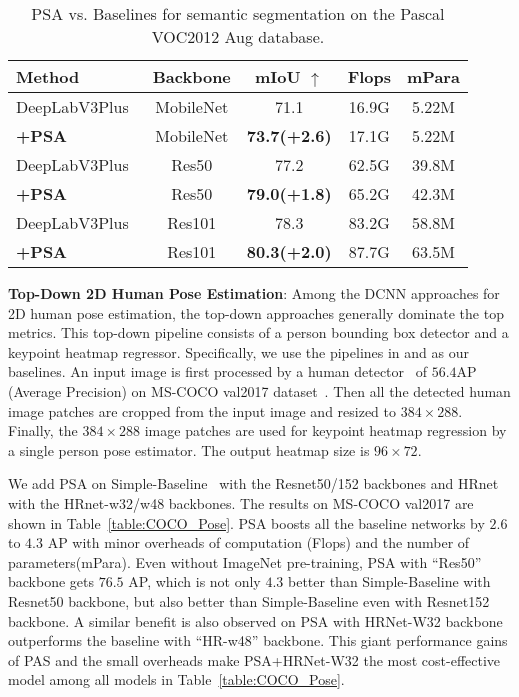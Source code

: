 \documentclass[10pt,twocolumn,letterpaper]{article}
\begin{document}
\begin{table}[!htb]
\centering
\fontsize{7}{8}\selectfont
\setlength{\tabcolsep}{5.6pt}
\begin{tabular}{l|c|c|c|c}
\hline
Method       & Backbone & mIoU $\uparrow$ & Flops  & mPara  \\ \hline \hline
DeepLabV3Plus~\cite{Chen17} & MobileNet  &71.1 &16.9G & 5.22M\\
\textbf{+PSA}      & MobileNet     & \textbf{73.7(+2.6)} & 17.1G & 5.22M  \\
\hline
DeepLabV3Plus~\cite{Chen17} & Res50  &77.2 &62.5G &39.8M\\
\textbf{+PSA}     & Res50   & \textbf{79.0(+1.8)} & 65.2G & 42.3M  \\
\hline
DeepLabV3Plus~\cite{Chen17} & Res101 &78.3 &83.2G &58.8M\\
\textbf{+PSA}      & Res101    & \textbf{80.3(+2.0)} & 87.7G & 63.5M  \\
\hline 
\end{tabular}
\caption{ PSA vs. Baselines for semantic segmentation on the Pascal VOC2012 Aug database. }
\label{table:VOC_Semantic}
\end{table}

\textbf{Top-Down 2D Human Pose Estimation}: Among the DCNN approaches for 2D human pose estimation, the top-down approaches generally dominate the top metrics. This top-down pipeline consists of a person bounding box detector and a keypoint heatmap regressor. Specifically, we use the pipelines in \cite{Xiao18} and \cite{Sun2019} as our baselines. An input image is first processed by a human detector~\cite{Xiao18} of $56.4$AP (Average Precision)  on MS-COCO val2017 dataset~\cite{Lin2014COCO}. Then all the detected human image patches are cropped from the input image and resized to $384\times 288$. Finally, the $384\times 288$ image patches are used for keypoint heatmap regression by a single person pose estimator. The output heatmap size is $96 \times 72$.

We add PSA on Simple-Baseline~\cite{Xiao18} with the Resnet50/152 backbones and HRnet~\cite{Sun2019} with the HRnet-w32/w48 backbones. The results on MS-COCO val2017 are shown in Table~\ref{table:COCO_Pose}. PSA boosts all the baseline networks by $2.6$ to $4.3$ AP with minor overheads of computation (Flops) and the number of parameters(mPara). Even without ImageNet pre-training, PSA with ``Res50'' backbone gets $76.5$ AP, which is not only $4.3$ better than Simple-Baseline with Resnet50 backbone, but also better than Simple-Baseline even with Resnet152 backbone. A similar benefit is also observed on PSA with HRNet-W32 backbone outperforms the baseline with ``HR-w48'' backbone. This giant performance gains of PAS and the small overheads make PSA+HRNet-W32 the most cost-effective model among all models in Table~\ref{table:COCO_Pose}. 
\end{document}
